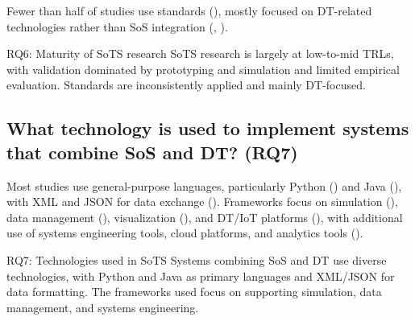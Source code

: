 Fewer than half of studies use standards (), mostly focused on DT-related technologies rather than SoS integration (, ).



\begin{conclusionframe}{RQ6: Maturity of SoTS research}
SoTS research is largely at low-to-mid TRLs, with validation dominated by prototyping and simulation and limited empirical evaluation. Standards are inconsistently applied and mainly DT-focused.
\end{conclusionframe}


\subsection{What technology is used to implement systems that combine SoS and DT? (RQ7)}\label{results-rq7}

Most studies use general-purpose languages, particularly Python () and Java (), with XML and JSON for data exchange (). Frameworks focus on simulation (), data management (), visualization (), and DT/IoT platforms (), with additional use of systems engineering tools, cloud platforms, and analytics tools ().

\begin{conclusionframe}{RQ7: Technologies used in SoTS}
Systems combining SoS and DT use diverse technologies, with Python and Java as primary languages and XML/JSON for data formatting. The frameworks used focus on supporting simulation, data management, and systems engineering.
\end{conclusionframe}